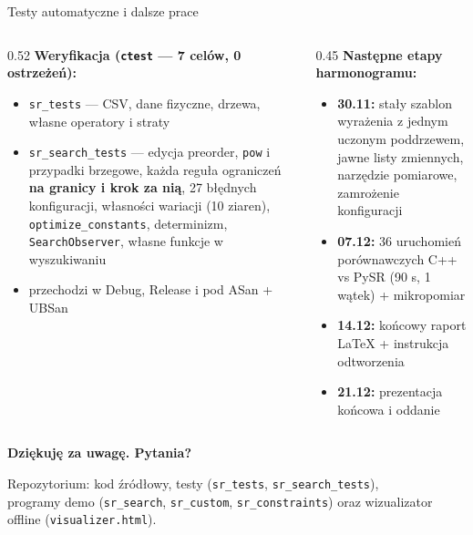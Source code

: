 \documentclass[
  polish,
  aspectratio=169,
]{beamer}
\begin{document}
\begin{frame}{Testy automatyczne i dalsze prace}
  \begin{columns}[T]
    \begin{column}{0.52\textwidth}
      \textbf{Weryfikacja (\texttt{ctest} --- 7 celów, 0 ostrzeżeń):}
      \begin{itemize}\footnotesize
        \item \texttt{sr\_tests} --- CSV, dane fizyczne, drzewa, własne operatory i straty
        \item \texttt{sr\_search\_tests} --- edycja preorder, \texttt{pow} i przypadki brzegowe, każda reguła ograniczeń \textbf{na granicy i krok za nią}, 27 błędnych konfiguracji, własności wariacji (10 ziaren), \texttt{optimize\_constants}, determinizm, \texttt{SearchObserver}, własne funkcje w wyszukiwaniu
        \item przechodzi w Debug, Release i pod ASan + UBSan
      \end{itemize}
    \end{column}
    \begin{column}{0.45\textwidth}
      \textbf{Następne etapy harmonogramu:}
      \begin{itemize}\footnotesize
        \item \textbf{30.11:} stały szablon wyrażenia z jednym uczonym poddrzewem, jawne listy zmiennych, narzędzie pomiarowe, zamrożenie konfiguracji
        \item \textbf{07.12:} 36 uruchomień porównawczych C++ vs PySR (90 s, 1 wątek) + mikropomiar
        \item \textbf{14.12:} końcowy raport LaTeX + instrukcja odtworzenia
        \item \textbf{21.12:} prezentacja końcowa i oddanie
      \end{itemize}
    \end{column}
  \end{columns}
\end{frame}

\begin{frame}
  \centering\vfill
  {\LARGE\bfseries Dziękuję za uwagę. Pytania?}\par\bigskip
  {\small\color{aghmuted}
    Repozytorium: kod źródłowy, testy (\texttt{sr\_tests}, \texttt{sr\_search\_tests}),\\
    programy demo (\texttt{sr\_search}, \texttt{sr\_custom}, \texttt{sr\_constraints}) oraz wizualizator offline (\texttt{visualizer.html}).}
  \vfill
\end{frame}
\end{document}
